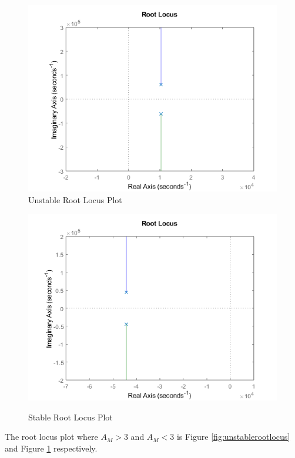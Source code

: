 \documentclass[12pt]{article}
\begin{document}
\begin{figure}
\centering
\begin{minipage}{.5\textwidth}
    \centering
    \includegraphics[height=0.7\textwidth]{Images/unstablerootlocus.png}\\
    \caption{Unstable Root Locus Plot}
    \label{fig:unstablerootlocus}
\end{minipage}%
\begin{minipage}{.5\textwidth}
    \centering
    \includegraphics[height=0.7\textwidth]{Images/stablerootlocus.png}\\
    \caption{Stable Root Locus Plot}
    \label{fig:rootlocus}
\end{minipage}
\end{figure}
\FloatBarrier
The root locus plot where $A_M>3$ and $A_M<3$ is Figure \ref{fig:unstablerootlocus} and Figure \ref{fig:rootlocus} respectively. 
\end{document}
